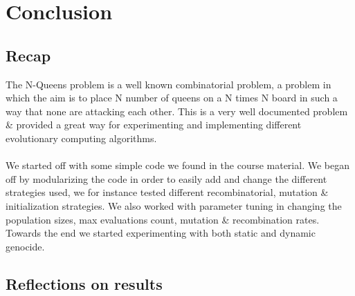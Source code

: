\section{Conclusion}
\subsection{Recap}
The N-Queens problem is a well known combinatorial problem, a problem in which the aim is to place N number of queens on a N times N board in such a way that none are attacking each other. This is a very well documented problem \& provided a great way for experimenting and implementing different evolutionary computing algorithms.
\\\\
We started off with some simple code we found in the course material. We began off by modularizing the code in order to easily add and change the different strategies used, we for instance tested different recombinatorial, mutation \& initialization strategies. We also worked with parameter tuning in changing the population sizes, max evaluations count, mutation \& recombination rates. Towards the end we started experimenting with both static and dynamic genocide.
\subsection{Reflections on results}
